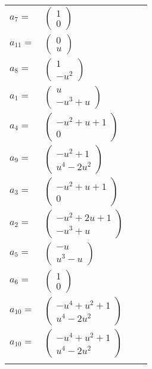 \documentclass[1p]{elsarticle_modified}
\theoremstyle{definition}
\begin{document}
\begin{tabular}{m{7pt} m{180pt} m{7pt} m{180pt} }
\flushright $a_{7}=$&$\begin{pmatrix}1\\0\end{pmatrix}$ \\
\flushright $a_{11}=$&$\begin{pmatrix}0\\u\end{pmatrix}$ \\
\flushright $a_{8}=$&$\begin{pmatrix}1\\- u^2\end{pmatrix}$ \\
\flushright $a_{1}=$&$\begin{pmatrix}u\\- u^3+u\end{pmatrix}$ \\
\flushright $a_{4}=$&$\begin{pmatrix}- u^2+u+1\\0\end{pmatrix}$ \\
\flushright $a_{9}=$&$\begin{pmatrix}- u^2+1\\u^4-2 u^2\end{pmatrix}$ \\
\flushright $a_{3}=$&$\begin{pmatrix}- u^2+u+1\\0\end{pmatrix}$ \\
\flushright $a_{2}=$&$\begin{pmatrix}- u^2+2 u+1\\- u^3+u\end{pmatrix}$ \\
\flushright $a_{5}=$&$\begin{pmatrix}- u\\u^3- u\end{pmatrix}$ \\
\flushright $a_{6}=$&$\begin{pmatrix}1\\0\end{pmatrix}$ \\
\flushright $a_{10}=$&$\begin{pmatrix}- u^4+u^2+1\\u^4-2 u^2\end{pmatrix}$\\ \flushright $a_{10}=$&$\begin{pmatrix}- u^4+u^2+1\\u^4-2 u^2\end{pmatrix}$\\&\end{tabular}
\end{document}
